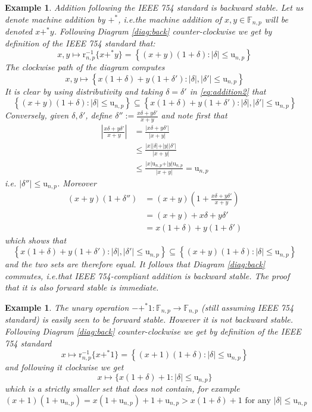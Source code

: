 \documentclass[10pt,a4paper]{article}
\theoremstyle{plain}
\newtheorem{example}[theorem]{Example}
\theoremstyle{definition}
\newcommand{\F}[1][n,p]{\mathbb{F}_{#1}}
\newcommand{\Round}[1][n,p]{\mathrm{r}_{#1}}
\newcommand{\uro}[1][n,p]{\mathrm{u}_{#1}}
\newcommand{\absv}[1]{\vert #1\vert}
\newcommand{\inv}{^{-1}}
\begin{document}
\begin{example}
Addition following the IEEE 754 standard is backward stable. Let us denote machine addition by $+^\ast$, i.e.\@ the machine addition of $x,y\in \F$ will be denoted $x+^\ast y$. Following Diagram \eqref{diag:back} counter-clockwise we get by definition of the IEEE 754 standard that:
\begin{equation}\label{eq:addition1}
x,y\mapsto \Round\inv\{x+^\ast y\}=\left\{(x+y)(1+\delta): \absv{\delta}\leq \uro\right\}
\end{equation}
The clockwise path of the diagram computes
\begin{equation}\label{eq:addition2}
x,y\mapsto \left\{x(1+\delta)+y(1+\delta') :  \absv{\delta},\absv{\delta'}\leq \uro\right\}
\end{equation}
It is clear by using distributivity and taking $\delta=\delta'$ in \eqref{eq:addition2} that 
\[
\left\{(x+y)(1+\delta): \absv{\delta}\leq \uro\right\}\subseteq \left\{x(1+\delta)+y(1+\delta') : \absv{\delta},\absv{\delta'}\leq \uro\right\}
\]
Conversely, given $\delta,\delta'$, define $\delta'':=\frac{x\delta+y\delta'}{x+y}$ and note first that
\begin{align*}
\left\vert \frac{x\delta+y\delta'}{x+y}\right\vert & = \frac{\absv{x\delta+y\delta'}}{\absv{x+y}}\\
&\leq \frac{\absv{x}\absv{\delta}+\absv{y}\absv{\delta'}}{\absv{x+y}}\\
&\leq \frac{\absv{x}\uro+\absv{y}\uro}{\absv{x+y}}=\uro
\end{align*}
i.e. $\absv{\delta''}\leq \uro$. Moreover
\begin{align*}
(x+y)(1+\delta'')&=(x+y)\left(1+\frac{x\delta+y\delta'}{x+y}\right)\\
&=(x+y)+x\delta+y\delta'\\
&=x(1+\delta)+y(1+\delta')
\end{align*}
which shows that 
\[
\left\{x(1+\delta)+y(1+\delta'): \absv{\delta},\absv{\delta'}\leq \uro\right\}\subseteq \left\{(x+y)(1+\delta): \absv{\delta}\leq \uro\right\}
\]
and the two sets are therefore equal. It follows that Diagram \eqref{diag:back} commutes, i.e.\@ that IEEE 754-compliant addition is backward stable. The proof that it is also forward stable is immediate.
\end{example}

\begin{example}
The unary operation $-+^\ast 1: \F\to\F$ (still assuming IEEE 754 standard) is easily seen to be forward stable. However it is not backward stable. Following Diagram \eqref{diag:back} counter-clockwise we get by definition of the IEEE 754 standard
\[
x\mapsto \Round\inv\{x+^\ast 1\}=\left\{(x+1)(1+\delta): \absv{\delta}\leq \uro\right\}
\]
and following it clockwise we get
\[
x\mapsto \{x(1+\delta)+1:\absv{\delta}\leq \uro\}
\]
which is a strictly smaller set that does not contain, for example
\[
(x+1)(1+\uro)=x(1+\uro)+1+\uro>x(1+\delta)+1 \text{ for any }\absv{\delta}\leq\uro
\]
\end{example}
\end{document}
